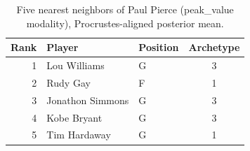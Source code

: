 \begin{table}[htbp]
  \centering\small
  \begin{tabular}{rllc}
    \toprule
    Rank & Player & Position & Archetype \\
    \midrule
    1 & Lou Williams & G & 3 \\
    2 & Rudy Gay & F & 1 \\
    3 & Jonathon Simmons & G & 3 \\
    4 & Kobe Bryant & G & 3 \\
    5 & Tim Hardaway & G & 1 \\
    \bottomrule
  \end{tabular}
  \caption{Five nearest neighbors of Paul Pierce (peak_value modality), Procrustes-aligned posterior mean.}
  \label{tab:Paul_Pierce_neighbors_peak_value}
\end{table}

